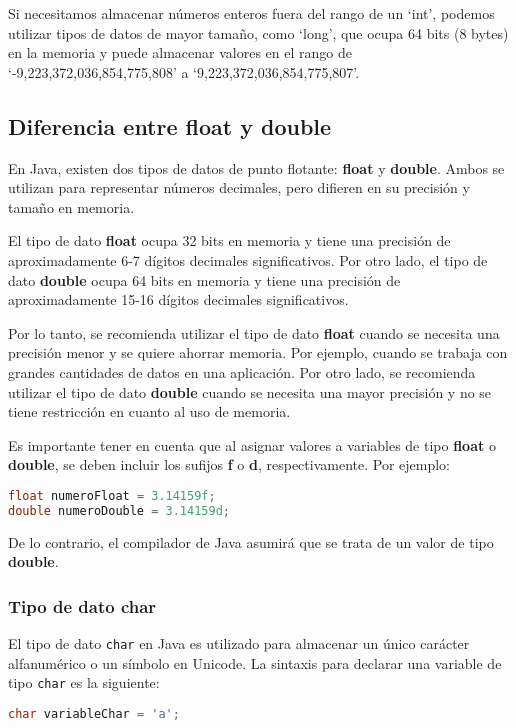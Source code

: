 \documentclass{article}
\begin{document}
Si necesitamos almacenar números enteros fuera del rango de un \enquote*{int}, podemos utilizar tipos de datos de mayor tamaño, como \enquote*{long}, que ocupa 64 bits (8 bytes) en la memoria y puede almacenar valores en el rango de \enquote*{-9,223,372,036,854,775,808} a \enquote*{9,223,372,036,854,775,807}.

\subsection*{Diferencia entre float y double}
En Java, existen dos tipos de datos de punto flotante: \textbf{float} y \textbf{double}. Ambos se utilizan para representar números decimales, pero difieren en su precisión y tamaño en memoria.

El tipo de dato \textbf{float} ocupa 32 bits en memoria y tiene una precisión de aproximadamente 6-7 dígitos decimales significativos. Por otro lado, el tipo de dato \textbf{double} ocupa 64 bits en memoria y tiene una precisión de aproximadamente 15-16 dígitos decimales significativos.

Por lo tanto, se recomienda utilizar el tipo de dato \textbf{float} cuando se necesita una precisión menor y se quiere ahorrar memoria. Por ejemplo, cuando se trabaja con grandes cantidades de datos en una aplicación. Por otro lado, se recomienda utilizar el tipo de dato \textbf{double} cuando se necesita una mayor precisión y no se tiene restricción en cuanto al uso de memoria.

Es importante tener en cuenta que al asignar valores a variables de tipo \textbf{float} o \textbf{double}, se deben incluir los sufijos \textbf{f} o \textbf{d}, respectivamente. Por ejemplo:

\begin{lstlisting}[language=Java]
float numeroFloat = 3.14159f;
double numeroDouble = 3.14159d;
\end{lstlisting}

De lo contrario, el compilador de Java asumirá que se trata de un valor de tipo \textbf{double}.

\subsubsection*{Tipo de dato char}
El tipo de dato \lstinline{char} en Java es utilizado para almacenar un único carácter alfanumérico o un símbolo en Unicode. La sintaxis para declarar una variable de tipo \lstinline{char} es la siguiente:

\begin{lstlisting}[language=Java]
char variableChar = 'a';
\end{lstlisting}
\end{document}

